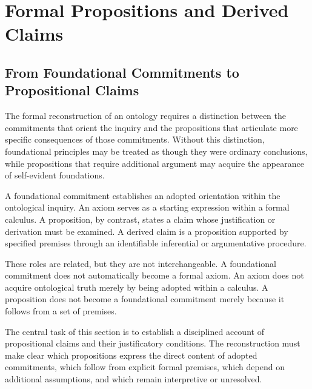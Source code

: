 
\section{Formal Propositions and Derived Claims}
\label{sec:formal-propositions-and-derived-claims}

\subsection{From Foundational Commitments to Propositional Claims}

The formal reconstruction of an ontology requires a distinction
between the commitments that orient the inquiry and the propositions
that articulate more specific consequences of those commitments.
Without this distinction, foundational principles may be treated
as though they were ordinary conclusions, while propositions that
require additional argument may acquire the appearance of
self-evident foundations.

A foundational commitment establishes an adopted orientation
within the ontological inquiry. An axiom serves as a starting
expression within a formal calculus. A proposition, by contrast,
states a claim whose justification or derivation must be examined.
A derived claim is a proposition supported by specified premises
through an identifiable inferential or argumentative procedure.

These roles are related, but they are not interchangeable.
A foundational commitment does not automatically become a formal
axiom. An axiom does not acquire ontological truth merely by being
adopted within a calculus. A proposition does not become a
foundational commitment merely because it follows from a set of
premises.

The central task of this section is to establish a disciplined
account of propositional claims and their justificatory conditions.
The reconstruction must make clear which propositions express
the direct content of adopted commitments, which follow from
explicit formal premises, which depend on additional assumptions,
and which remain interpretive or unresolved.

